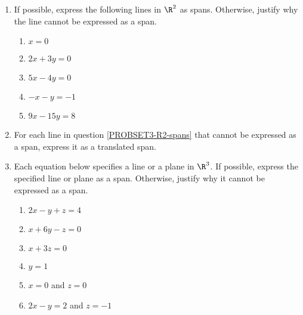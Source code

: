 \begin{exercises}
\begin{problist}
		\prob
		\begin{enumerate}
			\item If possible, express the following lines in $\R^{2}$
				as spans. Otherwise, justify why the line cannot
				be expressed as a span. \label{PROBSET3-R2-spans}
				\begin{enumerate}
					\item $x=0$

					\item $2x+3y=0$

					\item $5x-4y=0$

					\item $-x-y=-1$

					\item $9x-15y=8$
				\end{enumerate}

			\item For each line in question \ref{PROBSET3-R2-spans} that cannot
				be expressed as a span, express it as a translated
				span.

			\item Each equation below specifies a line or a plane in $\R^3$. If possible,
				express the specified line or plane as a span. Otherwise,
				 justify
				why it cannot be expressed as a span. \label{PROBSET3-R3-spans}
				\begin{enumerate}
					\item $2x-y+z=4$

					\item $x+6y-z=0$

					\item $x+3z=0$

					\item $y=1$

					\item $x=0$ and $z=0$

					\item $2x-y=2$ and $z=-1$
				\end{enumerate}


\end{enumerate}
\end{problist}
\end{exercises}
